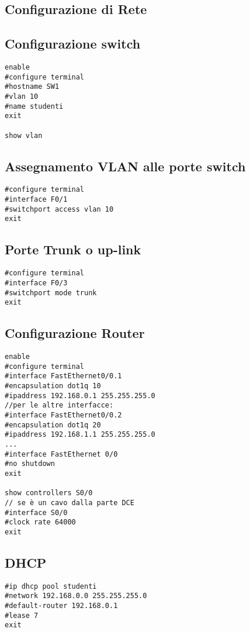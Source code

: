 \documentclass[a4paper, titlepage]{article}
\begin{document}
\begin{center}
\section*{\Huge Configurazione di Rete}
\end{center}
\begin{multicols}{2}
\subsection*{Configurazione switch}
	\begin{lstlisting}
enable
#configure terminal
#hostname SW1
#vlan 10
#name studenti
exit

show vlan	
	\end{lstlisting}
\subsection*{Assegnamento VLAN alle porte switch}
	\begin{lstlisting}
#configure terminal
#interface F0/1
#switchport access vlan 10
exit
	\end{lstlisting}
\subsection*{Porte Trunk o up-link}
	\begin{lstlisting}
#configure terminal
#interface F0/3
#switchport mode trunk
exit	
	\end{lstlisting}
\subsection*{Configurazione Router}
	\begin{lstlisting}
enable
#configure terminal
#interface FastEthernet0/0.1
#encapsulation dot1q 10
#ipaddress 192.168.0.1 255.255.255.0
//per le altre interfacce:
#interface FastEthernet0/0.2
#encapsulation dot1q 20
#ipaddress 192.168.1.1 255.255.255.0
...
#interface FastEthernet 0/0
#no shutdown
exit

show controllers S0/0
// se è un cavo dalla parte DCE
#interface S0/0
#clock rate 64000
exit

	\end{lstlisting}
\subsection*{DHCP}
	\begin{lstlisting}
#ip dhcp pool studenti
#network 192.168.0.0 255.255.255.0
#default-router 192.168.0.1
#lease 7
exit


\end{lstlisting}
\end{multicols}
\end{document}
